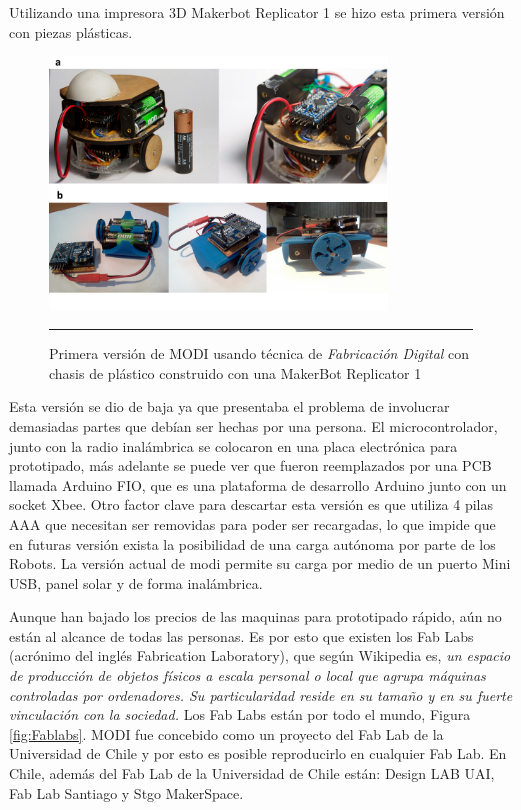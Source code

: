 Utilizando una impresora 3D Makerbot Replicator 1 se hizo esta primera versión con piezas plásticas.

\begin{figure}[htbp]
	\centering
		\includegraphics[width=0.8\textwidth]{./Pictures/modi_analogToDigital.png}
		\rule{35em}{0.5pt}
	\caption[modireplicator]{Primera versión de MODI usando técnica de \emph{ Fabricación Digital }con chasis de plástico construido con una MakerBot Replicator 1}
	\label{fig:modireplicator}
\end{figure}

Esta versión se dio de baja ya que presentaba el problema de involucrar demasiadas partes que debían ser hechas por una persona. El microcontrolador, junto con la radio inalámbrica se colocaron en una placa electrónica para prototipado, más adelante se puede ver que fueron reemplazados por una PCB llamada Arduino FIO, que es una plataforma de desarrollo Arduino junto con un socket Xbee. Otro factor clave para descartar esta versión es que utiliza 4 pilas AAA que necesitan ser removidas para poder ser recargadas, lo que impide que en futuras versión exista la posibilidad de una carga autónoma por parte de los Robots. La versión actual de modi permite su carga por medio de un puerto Mini USB, panel solar y de forma inalámbrica.

Aunque han bajado los precios de las maquinas para prototipado rápido, aún no están al alcance de todas las personas. Es por esto que existen los Fab Labs (acrónimo del inglés Fabrication Laboratory), que según Wikipedia es, \textit{un espacio de producción de objetos físicos a escala personal o local que agrupa máquinas controladas por ordenadores. Su particularidad reside en su tamaño y en su fuerte vinculación con la sociedad.} Los Fab Labs están por todo el mundo, Figura \ref{fig:Fablabs}. MODI fue concebido como un proyecto del Fab Lab de la Universidad de Chile y por esto es posible reproducirlo en cualquier Fab Lab. En Chile, además del Fab Lab de la Universidad de Chile están: Design LAB UAI, Fab Lab Santiago y Stgo MakerSpace. 

